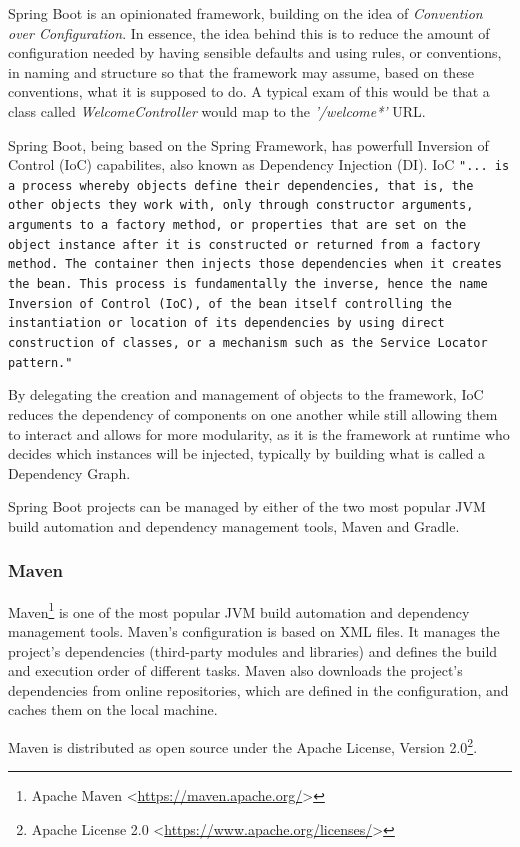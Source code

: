Spring Boot is an opinionated framework, building on the idea of \textit{Convention over Configuration}. In essence, the idea behind this is to reduce the amount of configuration needed by having sensible defaults and using rules, or conventions, in naming and structure so that the framework may assume, based on these conventions, what it is supposed to do. A typical exam of this would be that a class called \textit{WelcomeController} would map to the \textit{'/welcome*'} URL\cite{convention-over-conf}.

Spring Boot, being based on the Spring Framework, has powerfull Inversion of Control (IoC) capabilites, also known as Dependency Injection (DI). IoC \texttt{"... is a process whereby objects define their dependencies, that is, the other objects they work with, only through constructor arguments, arguments to a factory method, or properties that are set on the object instance after it is constructed or returned from a factory method. The container then injects those dependencies when it creates the bean. This process is fundamentally the inverse, hence the name Inversion of Control (IoC), of the bean itself controlling the instantiation or location of its dependencies by using direct construction of classes, or a mechanism such as the Service Locator pattern."}\cite{ioc}

By delegating the creation and management of objects to the framework, IoC reduces the dependency of components on one another while still allowing them to interact and allows for more modularity, as it is the framework at runtime who decides which instances will be injected, typically by building what is called a Dependency Graph.

Spring Boot projects can be managed by either of the two most popular JVM build automation and dependency management tools, Maven and Gradle.
\subsubsection*{Maven}
Maven\footnote{Apache Maven <\url{https://maven.apache.org/}>} is one of the most popular JVM build automation and dependency management tools. Maven's configuration is based on XML files. It manages the project's dependencies (third-party modules and libraries) and defines the build and execution order of different tasks. Maven also downloads the project's dependencies from online repositories, which are defined in the configuration, and caches them on the local machine.

Maven is distributed as open source under the Apache License, Version 2.0\footnote{Apache License 2.0 <\url{https://www.apache.org/licenses/}>}.

